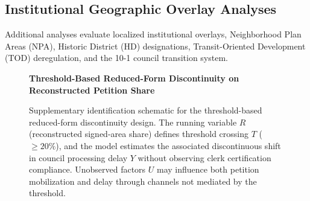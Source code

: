 \documentclass[11pt, letterpaper]{article}
\begin{document}
\newpage
\subsection{Institutional Geographic Overlay Analyses}
\label{app:overlays}

\noindent Additional analyses evaluate localized institutional overlays, Neighborhood Plan Areas (NPA), Historic District (HD) designations, Transit-Oriented Development (TOD) deregulation, and the 10-1 council transition system.

\begin{figure}[H]
\centering
\vspace{0.2cm}
\textbf{\small Threshold-Based Reduced-Form Discontinuity on Reconstructed Petition Share}\par\vspace{0.3cm}
\caption[Identification Diagram: Threshold-Based Reduced-Form Discontinuity]{Supplementary identification schematic for the threshold-based reduced-form discontinuity design. The running variable $R$ (reconstructed signed-area share) defines threshold crossing $T$ ($\geq 20\%$), and the model estimates the associated discontinuous shift in council processing delay $Y$ without observing clerk certification compliance. Unobserved factors $U$ may influence both petition mobilization and delay through channels not mediated by the threshold.}
\label{fig:causal_dag_appendix}
\end{figure}
\end{document}
